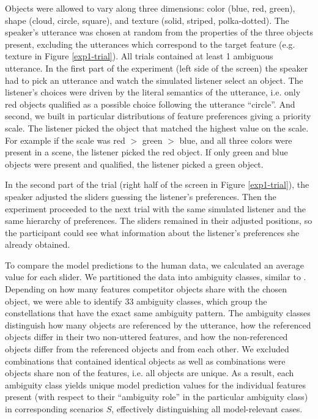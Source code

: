 \documentclass[10pt,a4paper]{article}
\begin{document}
Objects were allowed to vary along three dimensions: color (blue, red, green), shape (cloud, circle, square), and texture (solid, striped, polka-dotted). The speaker's utterance was chosen at random from the properties of the three objects present, excluding the utterances which correspond to the target feature (e.g. texture in Figure \ref{exp1-trial}).  All trials contained at least 1 ambiguous utterance. 
In the first part of the experiment (left side of the screen) the speaker had to pick an utterance and watch the simulated listener select an object. The listener's choices were driven by the literal semantics of the utterance, i.e. only red objects qualified as a possible choice following the utterance ``circle''. And second, we built in particular distributions of feature preferences giving a priority scale. The listener picked the object that matched the highest value on the scale. For example if the scale was red $>$ green $>$ blue, and all three colors were present in a scene, the listener picked the red object. If only green and blue objects were present and qualified, the listener picked a green object.

In the second part of the trial (right half of the screen in Figure \ref{exp1-trial}), the speaker adjusted the sliders guessing the listener's preferences. Then the experiment proceeded to the next trial with the same simulated listener and the same hierarchy of preferences. The sliders remained in their adjusted positions, so the participant could see what information about the listener's preferences she already obtained.


To compare the model predictions to the human data, we calculated an average value for each slider.
We partitioned the data into ambiguity classes, similar to . Depending on how many features competitor objects share with the chosen object, we were able to identify 33 ambiguity classes, which group the constellations that have the exact same ambiguity pattern. The ambiguity classes distinguish how many objects are referenced by the utterance, how the referenced objects differ in their two non-uttered features, and how the non-referenced objects differ from the referenced objects and from each other. We excluded combinations that contained identical objects as well as combinations were objects share non of the features, i.e. all objects are unique.
As a result, each ambiguity class yields unique model prediction values for the individual features present (with respect to their ``ambiguity role'' in the particular ambiguity class) in corresponding scenarios $S$, effectively distinguishing all model-relevant cases.
\end{document}
